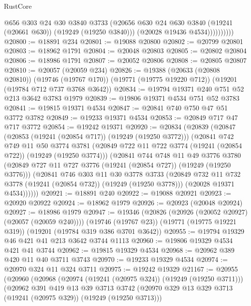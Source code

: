 \begin{lexlean}{RustCore}
\begin{coremodule}
                      @656
                      @303
                      @24
                      @30
                      @3840
                      @3733
                      (@20656 @630 @24 @630 @3840 (@19241 (@20661 @630)) (@19249 (@19250 @3840)))
                      (@20028 @19436 @4534))))))))))
@20800 := @18891 @234
@20801 := @19088 @20800
@20802 := @20799 @20801
@20803 := @18962 @1791
@20804 := @20048 @20803
@20805 := @20802 @20804
@20806 := @18986 @1791
@20807 := @20052 @20806
@20808 := @20805 @20807
@20810 := @20057 (@20059 @234)
@20826 := @19388
    (@20633 (@20808 @20810))
    (@19746 (@19767 @170))
    (@19771 (@19775 @19220 @712))
    (@19201 (@19784 @712 @737 @3768 @3642))
@20834 := @19794 @19371 @240 @751 @52 @213 @3642 @3783 @1979
@20839 := @19806 @19371 @4534 @751 @52 @3783
@20841 := @19815 @19371 @4534
@20847 := @20841 @740 @750 @47 @51 @3772 @3782
@20849 := @19233 @19371 @4534
@20853 := @20849 @717 @47 @717 @3772
@20854 := @19242 @19371
@20920 := @20834
    (@20839
      (@20847
        (@20853 (@19241 (@20854 @717)) (@19249 (@19250 @3772)))
        (@20841
          @742
          @749
          @11
          @50
          @3774
          @3781
          (@20849 @722 @11 @722 @3774 (@19241 (@20854 @722)) (@19249 (@19250 @3774)))
          (@20841
            @744
            @748
            @11
            @49
            @3776
            @3780
            (@20849 @727 @11 @727 @3776 (@19241 (@20854 @727)) (@19249 (@19250 @3776)))
            (@20841
              @746
              @303
              @11
              @30
              @3778
              @3733
              (@20849 @732 @11 @732 @3778 (@19241 (@20854 @732)) (@19249 (@19250 @3778)))
              (@20028 @19371 @4534))))))
@20921 := @18891 @240
@20922 := @19088 @20921
@20923 := @20920 @20922
@20924 := @18962 @1979
@20926 := @20923 (@20048 @20924)
@20927 := @18986 @1979
@20947 := @19346
    (@20826 (@20926 (@20052 @20927) (@20057 (@20059 @240))))
    (@19746 (@19767 @23))
    (@19771 (@19775 @19221 @319))
    (@19201 (@19784 @319 @386 @3701 @3642))
@20955 := @19794 @19329 @46 @421 @41 @213 @3642 @3744 @1113
@20960 := @19806 @19329 @4534 @421 @41 @3744
@20962 := @19815 @19329 @4534
@20968 := @20962 @389 @420 @11 @40 @3711 @3743
@20970 := @19233 @19329 @4534
@20974 := @20970 @324 @11 @324 @3711
@20975 := @19242 @19329
@21167 := @20955
    (@20960
      (@20968
        (@20974 (@19241 (@20975 @324)) (@19249 (@19250 @3711)))
        (@20962
          @391
          @419
          @13
          @39
          @3713
          @3742
          (@20970 @329 @13 @329 @3713 (@19241 (@20975 @329)) (@19249 (@19250 @3713)))

\end{coremodule}
\end{lexlean}
